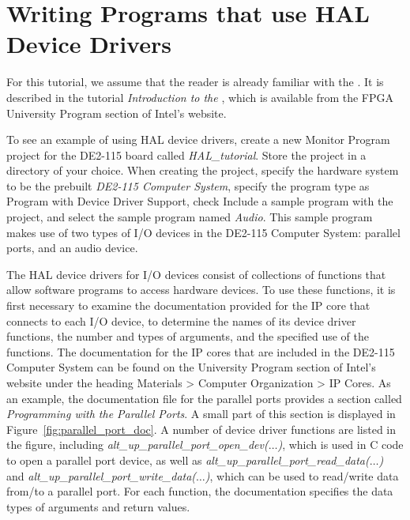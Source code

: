 \documentclass[11pt, twoside, pdftex]{article}
\begin{document}
\section{Writing Programs that use HAL Device Drivers}

For this tutorial, we assume that the reader is already familiar with the \productNameMed{}. It is
described in the tutorial {\it Introduction to 
the \productNameMed{}}, which is available from the FPGA University Program section of Intel's website.

To see an example of using HAL device drivers, create a new Monitor Program project for the 
DE2-115 board called {\it HAL\_tutorial}. Store the project in a directory of your choice. 
When creating the project, specify the hardware system to be the prebuilt {\it DE2-115 Computer System},
specify the program type as {\sf Program with Device Driver Support}, check {\sf Include a sample program with the project},
 and select the sample program named {\it Audio}.  This sample program makes use of two types of I/O devices 
in the DE2-115 Computer System: parallel ports, and an audio device.

The HAL device drivers for I/O devices consist of collections of functions that allow software
programs to access hardware devices. To use these functions, it is first necessary 
to examine the documentation provided for the IP core that connects to each I/O device, to 
determine the names of its device driver functions, the number 
and types of arguments, and the specified use of the functions. The documentation
for the IP cores that are included in the DE2-115 Computer System can be found on the University 
Program section of Intel's website under the heading {\sf Materials > Computer 
Organization > IP Cores}. As an example, the documentation file for the 
parallel ports provides a section called {\it Programming with the Parallel Ports}.  A small part of 
this section is displayed in Figure~\ref{fig:parallel_port_doc}.  
A number of device driver functions are listed in the figure,
including {\it alt\_up\_parallel\_port\_open\_dev($\ldots$)}, which is used in C code to open 
a parallel port device, as well as {\it alt\_up\_parallel\_port\_read\_data($\ldots$)} and
{\it alt\_up\_parallel\_port\_write\_data($\ldots$)}, which can be used to read/write data from/to 
a parallel port. For each function, the documentation specifies the data types 
of arguments and return values.
\end{document}
